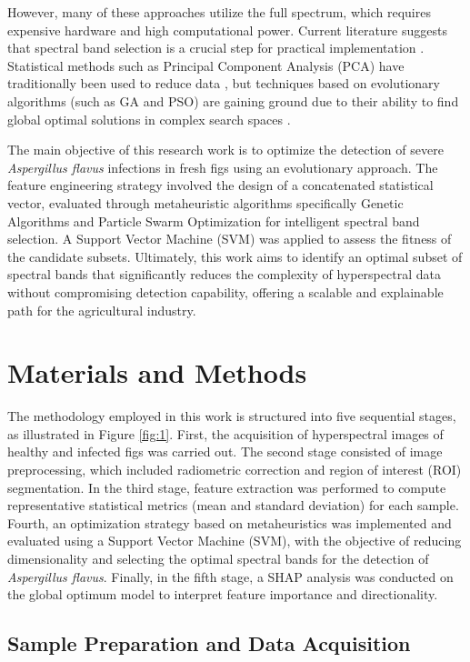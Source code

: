 \documentclass[runningheads]{llncs}
\begin{document}
However, many of these approaches utilize the full spectrum, which requires expensive hardware and high computational power. 
Current literature suggests that spectral band selection is a crucial step for practical implementation \cite{sawant_survey_2020}. 
Statistical methods such as Principal Component Analysis (PCA) have traditionally been used to reduce data \cite{chu_classifying_2020}, but techniques based on evolutionary algorithms (such as GA and PSO) are gaining ground due to their ability to find global optimal solutions in complex search spaces \cite{sawant_survey_2020}.

The main objective of this research work is to optimize the detection of severe \textit{Aspergillus flavus} infections in fresh figs using an evolutionary approach. The feature engineering strategy involved the design of a concatenated statistical vector, evaluated through metaheuristic algorithms specifically Genetic Algorithms and Particle Swarm Optimization for intelligent spectral band selection. A Support Vector Machine (SVM) was applied to assess the fitness of the candidate subsets. Ultimately, this work aims to identify an optimal subset of spectral bands that significantly reduces the complexity of hyperspectral data without compromising detection capability, offering a scalable and explainable path for the agricultural industry.

\section{Materials and Methods}

The methodology employed in this work is structured into five sequential stages, as illustrated in Figure \ref{fig:1}. First, the acquisition of hyperspectral images of healthy and infected figs was carried out. The second stage consisted of image preprocessing, which included radiometric correction and region of interest (ROI) segmentation. In the third stage, feature extraction was performed to compute representative statistical metrics (mean and standard deviation) for each sample. Fourth, an optimization strategy based on metaheuristics was implemented and evaluated using a Support Vector Machine (SVM), with the objective of reducing dimensionality and selecting the optimal spectral bands for the detection of \textit{Aspergillus flavus}. Finally, in the fifth stage, a SHAP analysis was conducted on the global optimum model to interpret feature importance and directionality.

\subsection{Sample Preparation and Data Acquisition}
\end{document}
